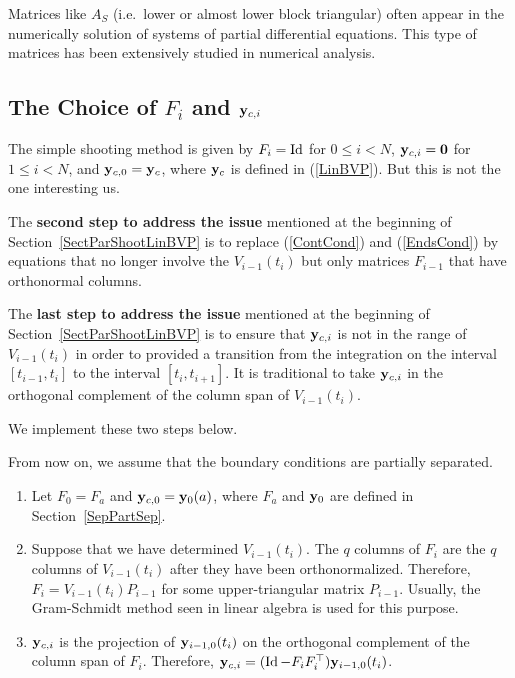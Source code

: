 \begin{rmkList}
\begin{enumerate}
Matrices like $A_S$ (i.e.\ lower or almost lower block triangular) often
appear in the numerically solution of systems of partial differential
equations.  This type of matrices has been extensively studied in
numerical analysis.  \label{ParShootPartSepRmkItem3}
\end{enumerate}
\end{rmkList}

\subsection{The Choice of $F_i$ and $\mathbf{y}_{c,i}$}\label{Fiyci}

The simple shooting method is given by $F_i = \operatorname{Id}$ for $0 \leq i < N$,
$\mathbf{y}_{c,i} = \mathbf{0}$ for $1 \leq i < N$, and
$\mathbf{y}_{c,0} = \mathbf{y}_c$, where $\mathbf{y}_c$ is defined in
(\ref{LinBVP}).  But this is not the one interesting us.

The {\bfseries second step to address the issue} mentioned at the
beginning of Section~\ref{SectParShootLinBVP} is to replace
(\ref{ContCond}) and (\ref{EndsCond}) by equations that no longer
involve the $V_{i-1}(t_i)$ but only matrices $F_{i-1}$ that have
orthonormal columns.

The {\bfseries last step to address the issue} mentioned at the
beginning of Section~\ref{SectParShootLinBVP} is to ensure that
$\mathbf{y}_{c,i}$ is not in the range of $V_{i-1}(t_i)$ in order to
provided a transition from the integration on the interval
$[t_{i-1},t_i]$ to the interval $[t_i,t_{i+1}]$.  It is traditional to
take $\mathbf{y}_{c,i}$ in the orthogonal complement of the column span
of $V_{i-1}(t_i)$.

We implement these two steps below.

From now on, we assume that the boundary conditions are partially
separated.

\begin{enumerate}
\item Let $F_0 = F_a$ and $\mathbf{y}_{c,0} = \mathbf{y}_0(a)$, where
$F_a$ and $\mathbf{y}_0$ are defined in Section~\ref{SepPartSep}.
\item Suppose that we have determined $V_{i-1}(t_i)$.  The $q$ columns
of $F_i$ are the $q$ columns of $V_{i-1}(t_i)$ after they have
been orthonormalized.  Therefore, $F_i = V_{i-1}(t_i) P_{i-1}$ for
some  upper-triangular matrix $P_{i-1}$.  Usually, the
Gram-Schmidt method seen in linear algebra is used for this purpose.
\item $\mathbf{y}_{c,i}$ is the projection of $\mathbf{y}_{i-1,0}(t_i)$ on
the orthogonal complement of the column span of $F_i$.  Therefore,
$\mathbf{y}_{c,i} = (\operatorname{Id} - F_iF_i^\top) \mathbf{y}_{i-1,0}(t_i)$.
\end{enumerate}

